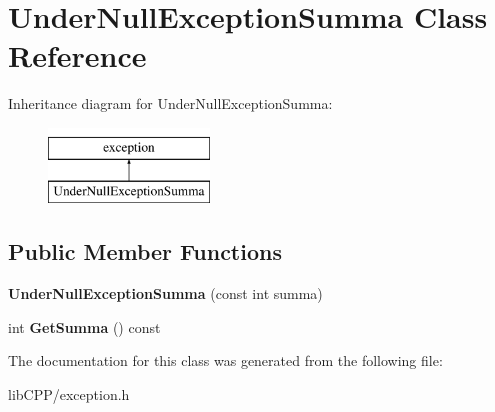 \hypertarget{classUnderNullExceptionSumma}{\section{Under\-Null\-Exception\-Summa Class Reference}
\label{classUnderNullExceptionSumma}
}
Inheritance diagram for Under\-Null\-Exception\-Summa\-:\begin{figure}[H]
\begin{center}
\leavevmode
\includegraphics[height=2.000000cm]{classUnderNullExceptionSumma}
\end{center}
\end{figure}
\subsection*{Public Member Functions}
\begin{DoxyCompactItemize}
\item 
\hypertarget{classUnderNullExceptionSumma_aa2ea9ddcdbf46e8c27186a4aa3363d7d}{{\bfseries Under\-Null\-Exception\-Summa} (const int summa)}\label{classUnderNullExceptionSumma_aa2ea9ddcdbf46e8c27186a4aa3363d7d}

\item 
\hypertarget{classUnderNullExceptionSumma_a09ba48ecd331f9762d3e65898c721c2f}{int {\bfseries Get\-Summa} () const }\label{classUnderNullExceptionSumma_a09ba48ecd331f9762d3e65898c721c2f}

\end{DoxyCompactItemize}


The documentation for this class was generated from the following file\-:\begin{DoxyCompactItemize}
\item 
lib\-C\-P\-P/exception.\-h\end{DoxyCompactItemize}
